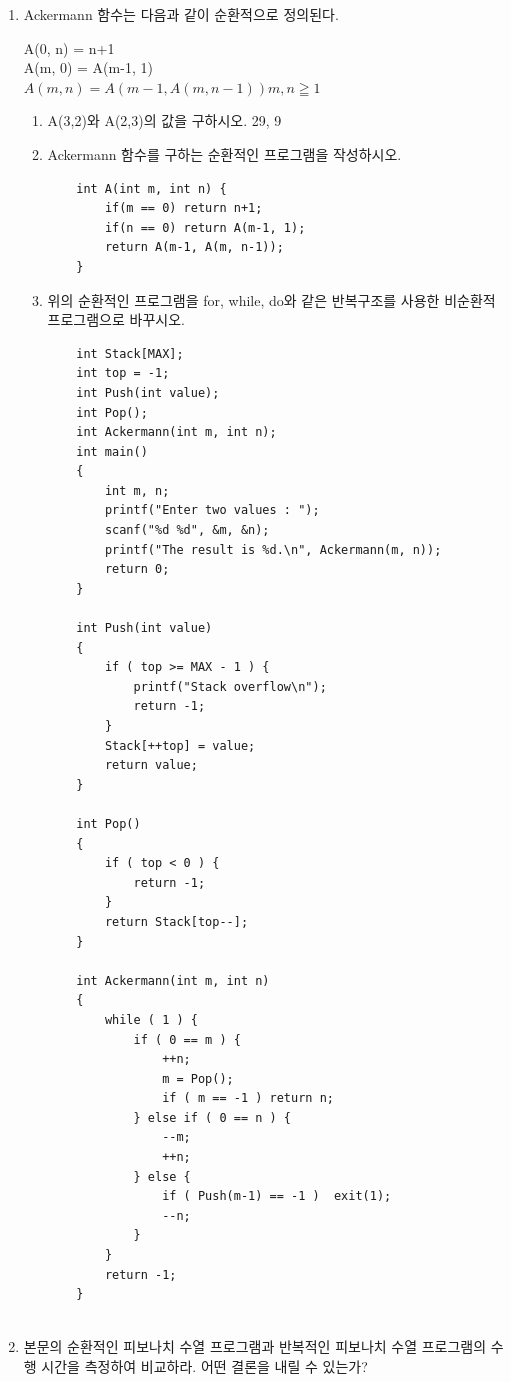 \documentclass[11pt,a4paper]{article}
\begin{document}
\begin{enumerate}
\begin{lstlisting}
//반복함수
int factorial(int n) {
	int r = 1;
	for(int i=1; i<=n; i++) r *= i;
	return r;
}
int nPr(int n, int r) {
	return factorial(n)/factorial(r);
}
int nCr(int n, int r)
{
	return nPr(n, r)/factorial(r);
}
\end{lstlisting}

\item Ackermann 함수는 다음과 같이 순환적으로 정의된다.

A(0, n) = n+1\\
A(m, 0) = A(m-1, 1)\\
$ A(m, n) = A(m-1, A(m, n-1)) m,n\geqq 1 $

\begin{enumerate}
	\item A(3,2)와 A(2,3)의 값을 구하시오. 29, 9
	\item Ackermann 함수를 구하는 순환적인 프로그램을 작성하시오.
	\begin{lstlisting}
	int A(int m, int n) {
		if(m == 0) return n+1;
		if(n == 0) return A(m-1, 1);
		return A(m-1, A(m, n-1));
	}
	\end{lstlisting}
	
	\item 위의 순환적인 프로그램을 for, while, do와 같은 반복구조를 사용한 비순환적 프로그램으로 바꾸시오.
	\begin{lstlisting}
	int Stack[MAX];
	int top = -1;
	int Push(int value);
	int Pop();
	int Ackermann(int m, int n);
	int main()
	{
		int m, n;
		printf("Enter two values : ");
		scanf("%d %d", &m, &n);
		printf("The result is %d.\n", Ackermann(m, n));
		return 0;
	}
	
	int Push(int value)
	{
		if ( top >= MAX - 1 ) {
			printf("Stack overflow\n");
			return -1;
		}
		Stack[++top] = value;
		return value;
	}
	
	int Pop()
	{
		if ( top < 0 ) {
			return -1;
		}
		return Stack[top--];
	}
	
	int Ackermann(int m, int n)
	{
		while ( 1 ) {
			if ( 0 == m ) {
				++n;
				m = Pop();
				if ( m == -1 ) return n;
			} else if ( 0 == n ) {
				--m;
				++n;
			} else {
				if ( Push(m-1) == -1 )	exit(1);
				--n;
			}
		}
		return -1;
	}
	
	\end{lstlisting}
\end{enumerate}
	
\item 본문의 순환적인 피보나치 수열 프로그램과 반복적인 피보나치 수열 프로그램의 수행 시간을 측정하여 비교하라. 어떤 결론을 내릴 수 있는가? 


\end{enumerate}
\end{document}
